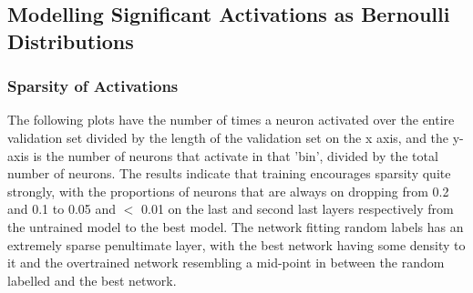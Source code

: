 \documentclass{article}
\begin{document}
        \subsection{Modelling Significant Activations as Bernoulli Distributions}
            
            \subsubsection{Sparsity of Activations}
                The following plots have the number of times a neuron activated over the entire validation set divided by the length of the validation set on the x axis, and the y-axis is the number of neurons that activate in that 'bin', divided by the total number of neurons.
                The results indicate that training encourages sparsity quite strongly, with the proportions of neurons that are always on dropping from 0.2 and 0.1 to 0.05 and $<$ 0.01 on the last and second last layers respectively from the untrained model to the best model. The network fitting random labels has an extremely sparse penultimate layer, with the best network having some density to it and the overtrained network resembling a mid-point in between the random labelled and the best network. 
                
\end{document}
